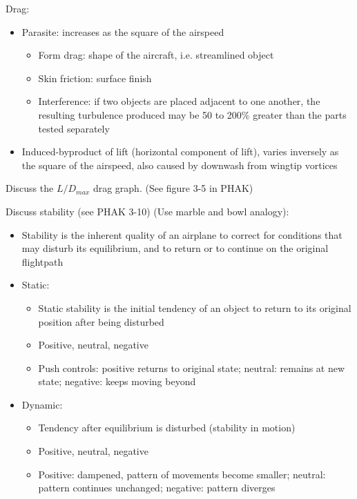 \documentclass[twoside,openright]{report}
\begin{document}
Drag:

\begin{itemize}
  \item Parasite: increases as the square of the airspeed
    \begin{itemize}
      \item Form drag: shape of the aircraft, i.e. streamlined object

      \item Skin friction: surface finish

      \item Interference: if two objects are placed adjacent to one another, the
        resulting turbulence produced may be 50 to 200\% greater than the parts
        tested separately
    \end{itemize}
  \item Induced-byproduct of lift (horizontal component of lift), varies
    inversely as the square of the airspeed, also caused by downwash from
    wingtip vortices
\end{itemize}

Discuss the $L/D_{max}$ drag graph. (See figure 3-5 in PHAK)

Discuss stability (see PHAK 3-10) (Use marble and bowl analogy):

\begin{itemize}
  \item Stability is the inherent quality of an airplane to correct for
    conditions that may disturb its equilibrium, and to return or to continue
    on the original flightpath
  \item Static:
    \begin{itemize}
      \item Static stability is the initial tendency of an object to return to
        its original position after being disturbed

      \item Positive, neutral, negative

      \item Push controls: positive returns to original state; neutral: remains
        at new state; negative: keeps moving beyond
    \end{itemize}
  \item Dynamic:
    \begin{itemize}
      \item Tendency after equilibrium is disturbed (stability in motion)

      \item Positive, neutral, negative

      \item Positive: dampened, pattern of movements become smaller; neutral:
        pattern continues unchanged; negative: pattern diverges
    \end{itemize}
\end{itemize}
\end{document}
